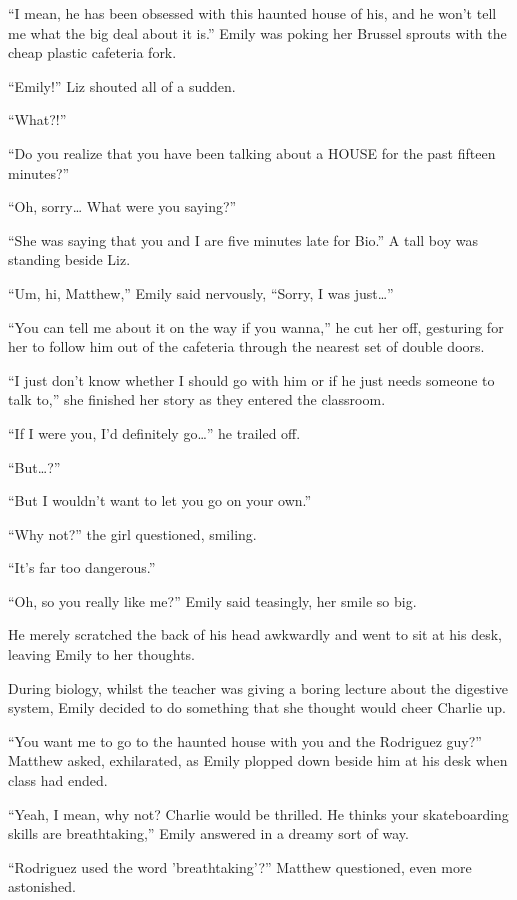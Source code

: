 “I mean, he has been obsessed with this haunted house of his, and he won't tell me what the big deal about it is.” Emily was poking her Brussel sprouts with the cheap plastic cafeteria fork.

“Emily!” Liz shouted all of a sudden.

“What?!”

“Do you realize that you have been talking about a HOUSE for the past fifteen minutes?”

“Oh, sorry… What were you saying?”

“She was saying that you and I are five minutes late for Bio.” A tall boy was standing beside Liz.

“Um, hi, Matthew,” Emily said nervously, “Sorry, I was just…”

“You can tell me about it on the way if you wanna,” he cut her off, gesturing for her to follow him out of the cafeteria through the nearest set of double doors.

\bigskip

“I just don't know whether I should go with him or if he just needs someone to talk to,” she finished her story as they entered the classroom.

“If I were you, I'd definitely go…” he trailed off.

“But…?”

“But I wouldn't want to let you go on your own.”

“Why not?” the girl questioned, smiling.

“It's far too dangerous.”

“Oh, so you really like me?” Emily said teasingly, her smile so big.

He merely scratched the back of his head awkwardly and went to sit at his desk, leaving Emily to her thoughts.

During biology, whilst the teacher was giving a boring lecture about the digestive system, Emily decided to do something that she thought would cheer Charlie up.

\bigskip

“You want me to go to the haunted house with you and the Rodriguez guy?” Matthew asked, exhilarated, as Emily plopped down beside him at his desk when class had ended.

“Yeah, I mean, why not? Charlie would be thrilled. He thinks your skateboarding skills are breathtaking,” Emily answered in a dreamy sort of way.

“Rodriguez used the word 'breathtaking'?” Matthew questioned, even more astonished.

